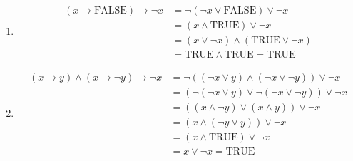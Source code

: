 \documentclass{article}
\theoremstyle{definition}
\begin{document}
\begin{solution}
\begin{enumerate}
        \item
        \begin{align*}
            (x \rightarrow \mathrm{FALSE}) \rightarrow \neg x
            &=\neg(\neg x \vee \mathrm{FALSE}) \vee \neg x
          \\&=(x \wedge \mathrm{TRUE}) \vee \neg x 
          \\&=(x \vee \neg x)\wedge(\mathrm{TRUE} \vee \neg x) 
          \\&= \mathrm{TRUE} \wedge \mathrm{TRUE} = \mathrm{TRUE}
        \end{align*}
        \item
        \begin{align*}
            (x \rightarrow y) \wedge (x \rightarrow \neg y) \rightarrow \neg x
            &= \neg((\neg x \vee y) \wedge (\neg x \vee \neg y)) \vee \neg x
          \\&= (\neg(\neg x \vee y) \vee \neg(\neg x \vee \neg y)) \vee \neg x
          \\&= ((x \wedge \neg y) \vee (x \wedge y)) \vee \neg x
          \\&= (x \wedge (\neg y \vee y))\vee \neg x
          \\&= (x \wedge \mathrm{TRUE}) \vee \neg x
          \\&= x \vee \neg x = \mathrm{TRUE}
        \end{align*}
    \end{enumerate}
\end{solution}
\end{document}
